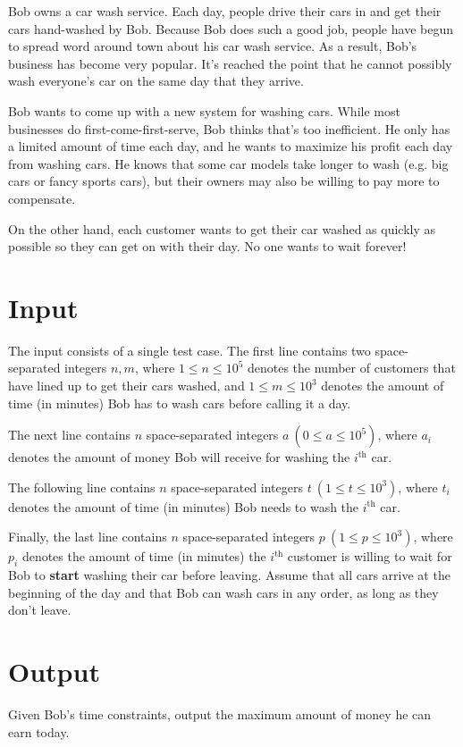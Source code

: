 
Bob owns a car wash service. Each day, people drive their cars in and get their cars hand-washed by Bob. Because Bob does such a good job, people have begun to spread word around town about his car wash service. As a result, Bob's business has become very popular. It's reached the point that he cannot possibly wash everyone's car on the same day that they arrive. 

Bob wants to come up with a new system for washing cars. While most businesses do first-come-first-serve, Bob thinks that's too inefficient. He only has a limited amount of time each day, and he wants to maximize his profit each day from washing cars. He knows that some car models take longer to wash (e.g. big cars or fancy sports cars), but their owners may also be willing to pay more to compensate. 

On the other hand, each customer wants to get their car washed as quickly as possible so they can get on with their day. No one wants to wait forever!

\section*{Input}

The input consists of a single test case. The first line contains two space-separated integers $n, m$, where $1 \leq n \leq 10^5$ denotes the number of customers that have lined up to get their cars washed, and $1 \leq m \leq 10^3$ denotes the amount of time (in minutes) Bob has to wash cars before calling it a day.

The next line contains $n$ space-separated integers $a\ (0 \leq a \leq 10^5)$, where $a_i$ denotes the amount of money Bob will receive for washing the $i^\text{th}$ car.

The following line contains $n$ space-separated integers $t\ (1 \leq t \leq 10^3)$, where $t_i$ denotes the amount of time (in minutes) Bob needs to wash the $i^\text{th}$ car.

Finally, the last line contains $n$ space-separated integers $p\ (1 \leq p \leq 10^3)$, where $p_i$ denotes the amount of time (in minutes) the $i^\text{th}$ customer is willing to wait for Bob to \textbf{start} washing their car before leaving. Assume that all cars arrive at the beginning of the day and that Bob can wash cars in any order, as long as they don't leave.

\section*{Output}

Given Bob's time constraints, output the maximum amount of money he can earn today. 
